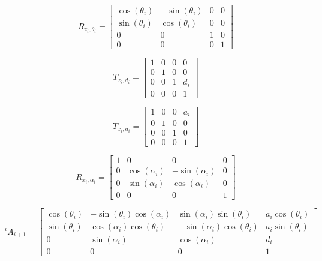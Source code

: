 
\begin{equation}\label{DH_matrix_Rz}
R_{z_i, \theta_i} = 
\left[\begin{matrix}
\cos{\left (\theta_i \right )} & - \sin{\left (\theta_i \right )} & 0 & 0\\
\sin{\left (\theta_i \right )} & \cos{\left (\theta_i \right )} & 0 & 0\\
0 & 0 & 1 & 0\\0 & 0 & 0 & 1
\end{matrix}\right]
\end{equation}

\begin{equation}\label{DH_matrix_Tz}
T_{z_i, d_i} =
\left[\begin{matrix}
1 & 0 & 0 & 0\\
0 & 1 & 0 & 0\\
0 & 0 & 1 & d_{i}\\
0 & 0 & 0 & 1
\end{matrix}\right]
\end{equation}

\begin{equation}\label{DH_matrix_Tx}
T_{x_i, a_i} =
\left[\begin{matrix}
1 & 0 & 0 & a_{i}\\
0 & 1 & 0 & 0\\
0 & 0 & 1 & 0\\
0 & 0 & 0 & 1
\end{matrix}\right]
\end{equation}

\begin{equation}\label{DH_matrix_Rx}
R_{x_i, \alpha_i} =
\left[\begin{matrix}
1 & 0 & 0 & 0\\
0 & \cos{\left (\alpha_i \right )} & - \sin{\left (\alpha_i \right )} & 0\\
0 & \sin{\left (\alpha_i \right )} & \cos{\left (\alpha_i \right )} & 0\\
0 & 0 & 0 & 1
\end{matrix}\right]
\end{equation}

\begin{equation}\label{DH_matrix_Ai}
^{i}A_{i+1} =
\left[\begin{matrix}
\cos{\left (\theta_i \right )} & - \sin{\left (\theta_i \right )} \cos{\left (\alpha_i \right )} & \sin{\left (\alpha_i \right )} \sin{\left (\theta_i \right )} & a_{i} \cos{\left (\theta_i \right )}\\
\sin{\left (\theta_i \right )} & \cos{\left (\alpha_i \right )} \cos{\left (\theta_i \right )} & - \sin{\left (\alpha_i \right )} \cos{\left (\theta_i \right )} & a_{i} \sin{\left (\theta_i \right )}\\
0 & \sin{\left (\alpha_i \right )} & \cos{\left (\alpha_i \right )} & d_{i}\\
0 & 0 & 0 & 1
\end{matrix}\right]
\end{equation}